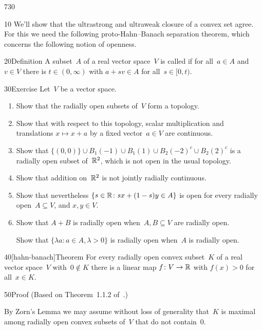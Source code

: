 \begin{parsec}{730}%
\begin{point}{10}%
We'll show that the ultrastrong and ultraweak closure
of a convex set agree. 
For this we need the following proto-Hahn--Banach separation theorem,
which concerns the following notion of openness.
\end{point}
\begin{point}{20}{Definition}%
A subset~$A$ of a real vector space~$V$ 
is called %
if for all~$a\in A$ and~$v\in V$
there is $t\in (0,\infty)$
with $a+sv\in A$ for all~$s\in [0,t)$.
\end{point}
\begin{point}{30}{Exercise}%
Let~$V$ be a vector space.
\begin{enumerate}
\item
Show that the radially open subsets of~$V$ form a topology.
\item
Show that with respect to this topology,
scalar multiplication and translations $x\mapsto x+a$
by a fixed vector~$a\in V$ are continuous.
\item
Show that $\{(0,0)\}\cup B_1(-1)\cup B_1(1)\cup B_2(-2)^c\cup B_2(2)^c$
is a radially open subset of~$\mathbb{R}^2$, 
which is not open
in the usual topology.

\item
Show that addition on~$\mathbb{R}^2$ is not jointly radially continuous.
\item
	Show that nevertheless $\{s\in \mathbb{R} \colon sx+(1-s) y\in A\}$
is open for every radially open~$A\subseteq V$, and $x,y\in V$.
\item
Show that $A+B$ is radially open when~$A,B\subseteq V$ are radially open.

Show that $\{\lambda a\colon a\in A,\lambda>0\}$ is radially open
when~$A$ is radially open.
\end{enumerate}
\end{point}
\begin{point}{40}[hahn-banach]{Theorem}%
For every radially open
convex subset~$K$ of a real vector space~$V$
with~$0\notin K$
there is a linear map $f\colon V\to\mathbb{R}$
with $f(x)>0$ for all~$x\in K$.
\begin{point}{50}{Proof}%
(Based on Theorem~1.1.2 of~\cite{kr}.)

By Zorn's Lemma we may assume without loss of generality that~$K$ is maximal
among radially open convex subsets of~$V$ that do not contain~$0$.


\end{point}
\end{point}
\end{parsec}
